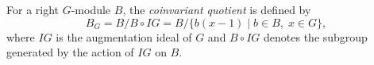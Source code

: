 For a right $G$-module $B$, the \emph{coinvariant quotient} is defined by
$$B_G = B / B \circ IG = B / \{ b(x-1) \mid b \in B,\; x \in G \},$$
where $IG$ is the augmentation ideal of $G$ and $B \circ IG$ denotes the subgroup generated by the action of $IG$ on $B$.
